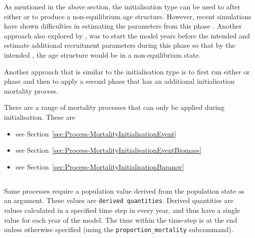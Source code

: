 As mentioned in the above section, the  initialisation type can be used to after either  or  to produce a non-equilibrium age structure. However, recent simulations have shown difficulties in estimating the parameters from this phase \citep{roberts_dunn_estimate_start_M_init}. Another approach also explored by \cite{roberts_dunn_estimate_start_M_init}, was to start the model  years before the intended  and estimate additional recruitment parameters during this phase so that by the intended , the age structure would be in a non-equilibrium state.
\fi %

\ifAgeBased
Another approach that is similar to the  initialisation type is to first run either  or  phase and then to apply a second  phase that has an additional initialisation mortality process.

There are a range of mortality processes that can only be applied during initialisation. These are

\begin{itemize}
	\item {} see Section~\ref{sec:Process-MortalityInitialisationEvent}
	\item {} see Section~\ref{sec:Process-MortalityInitialisationEventBiomass}
	\item {} see  Section~\ref{sec:Process-MortalityInitialisationBaranov}
\end{itemize}
\fi %

\subsection{}\label{sec:Process}

\ifAgeBased

\else

\fi 

\subsection{\label{sec:DerivedQuantity}}

Some processes require a population value derived from the population state as an argument. These values are \texttt{derived quantities}. Derived quantities are values calculated in a specified time step in every year, and thus have a single value for each year of the model. The time within the time-step is at the end unless otherwise specified (using the \texttt{proportion\_mortality} subcommand).

